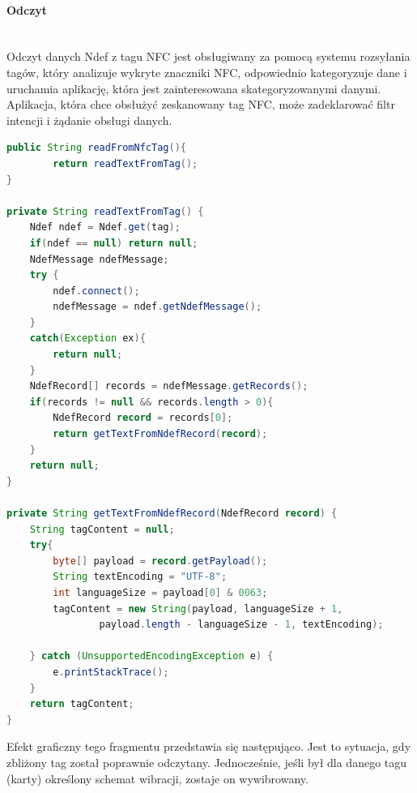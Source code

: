 \documentclass{article}
\numberwithin{equation}{section}
\begin{document}
\paragraph{Odczyt}\mbox{}\\
Odczyt danych Ndef z tagu NFC jest obsługiwany za pomocą systemu rozsyłania tagów, który analizuje wykryte znaczniki NFC, odpowiednio kategoryzuje dane i uruchamia aplikację, która jest zainteresowana skategoryzowanymi danymi. Aplikacja, która chce obsłużyć zeskanowany tag NFC, może zadeklarować filtr intencji i żądanie obsługi danych.
\begin{lstlisting}[language=Java]
public String readFromNfcTag(){
        return readTextFromTag();
}

private String readTextFromTag() {
    Ndef ndef = Ndef.get(tag);
    if(ndef == null) return null;
    NdefMessage ndefMessage;
    try {
        ndef.connect();
        ndefMessage = ndef.getNdefMessage();
    }
    catch(Exception ex){
        return null;
    }
    NdefRecord[] records = ndefMessage.getRecords();
    if(records != null && records.length > 0){
        NdefRecord record = records[0];
        return getTextFromNdefRecord(record);
    }
    return null;
}

private String getTextFromNdefRecord(NdefRecord record) {
    String tagContent = null;
    try{
        byte[] payload = record.getPayload();
        String textEncoding = "UTF-8";
        int languageSize = payload[0] & 0063;
        tagContent = new String(payload, languageSize + 1,
                payload.length - languageSize - 1, textEncoding);

    } catch (UnsupportedEncodingException e) {
        e.printStackTrace();
    }
    return tagContent;
}
\end{lstlisting}
Efekt graficzny tego fragmentu przedstawia się następująco. Jest to sytuacja, gdy zbliżony tag został poprawnie odczytany. Jednocześnie, jeśli był dla danego tagu (karty) określony schemat wibracji, zostaje on wywibrowany.
\end{document}
